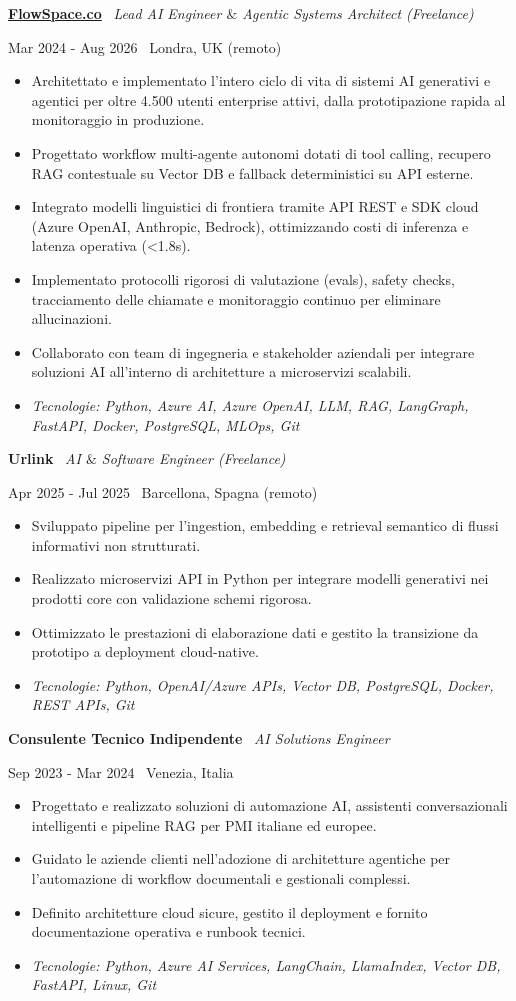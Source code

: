 \documentclass[a4paper,10pt]{article}
\newcommand{\role}[4]{%
  \vspace{2pt}\noindent
  \begin{minipage}[t]{0.70\textwidth}\raggedright\textbf{#1} \textbullet\ \textit{#3}\end{minipage}%
  \hfill
  \begin{minipage}[t]{0.28\textwidth}\raggedleft\footnotesize\color{gray}#2 \textbullet\ #4\end{minipage}%
  \vspace{1pt}%
}
\begin{document}
\role{\href{https://flowspace.co}{FlowSpace.co}}{Mar 2024 - Aug 2026}{Lead AI Engineer $\&$ Agentic Systems Architect (Freelance)}{Londra, UK (remoto)}
\begin{itemize}
  \item Architettato e implementato l'intero ciclo di vita di sistemi AI generativi e agentici per oltre 4.500 utenti enterprise attivi, dalla prototipazione rapida al monitoraggio in produzione.
  \item Progettato workflow multi-agente autonomi dotati di tool calling, recupero RAG contestuale su Vector DB e fallback deterministici su API esterne.
  \item Integrato modelli linguistici di frontiera tramite API REST e SDK cloud (Azure OpenAI, Anthropic, Bedrock), ottimizzando costi di inferenza e latenza operativa (<1.8s).
  \item Implementato protocolli rigorosi di valutazione (evals), safety checks, tracciamento delle chiamate e monitoraggio continuo per eliminare allucinazioni.
  \item Collaborato con team di ingegneria e stakeholder aziendali per integrare soluzioni AI all'interno di architetture a microservizi scalabili.
  \item \textit{Tecnologie: Python, Azure AI, Azure OpenAI, LLM, RAG, LangGraph, FastAPI, Docker, PostgreSQL, MLOps, Git}
\end{itemize}

\role{Urlink}{Apr 2025 - Jul 2025}{AI $\&$ Software Engineer (Freelance)}{Barcellona, Spagna (remoto)}
\begin{itemize}
  \item Sviluppato pipeline per l'ingestion, embedding e retrieval semantico di flussi informativi non strutturati.
  \item Realizzato microservizi API in Python per integrare modelli generativi nei prodotti core con validazione schemi rigorosa.
  \item Ottimizzato le prestazioni di elaborazione dati e gestito la transizione da prototipo a deployment cloud-native.
  \item \textit{Tecnologie: Python, OpenAI/Azure APIs, Vector DB, PostgreSQL, Docker, REST APIs, Git}
\end{itemize}

\role{Consulente Tecnico Indipendente}{Sep 2023 - Mar 2024}{AI Solutions Engineer}{Venezia, Italia}
\begin{itemize}
  \item Progettato e realizzato soluzioni di automazione AI, assistenti conversazionali intelligenti e pipeline RAG per PMI italiane ed europee.
  \item Guidato le aziende clienti nell'adozione di architetture agentiche per l'automazione di workflow documentali e gestionali complessi.
  \item Definito architetture cloud sicure, gestito il deployment e fornito documentazione operativa e runbook tecnici.
  \item \textit{Tecnologie: Python, Azure AI Services, LangChain, LlamaIndex, Vector DB, FastAPI, Linux, Git}
\end{itemize}
\end{document}
